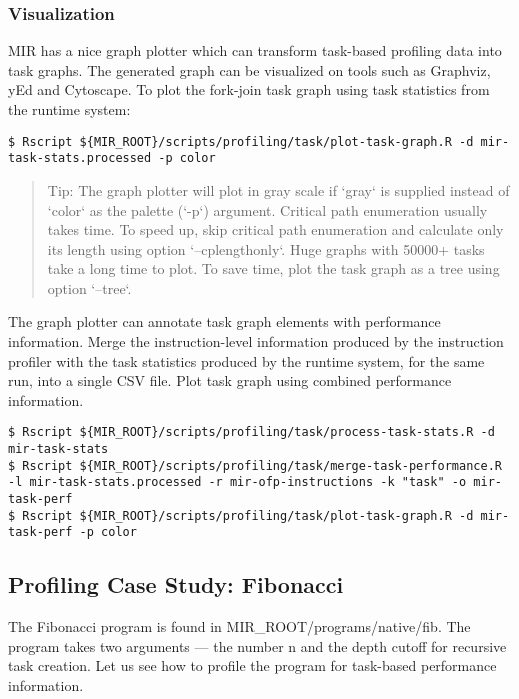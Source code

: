 \documentclass[11pt,a4paper]{article}
\begin{document}
\subsubsection{Visualization}

MIR has a nice graph plotter which can transform task-based profiling data into task graphs. The generated graph can be visualized on tools such as Graphviz, yEd and Cytoscape.  To plot the fork-join task graph using task statistics from the runtime system: 

\begin{lstlisting}[style=MyInputStyle]
$ Rscript ${MIR_ROOT}/scripts/profiling/task/plot-task-graph.R -d mir-task-stats.processed -p color
\end{lstlisting}

\begin{framed}
\begin{quote}
Tip: The graph plotter will plot in gray scale if `gray` is supplied instead of `color` as the palette (`-p`) argument. Critical path enumeration usually takes time. To speed up, skip critical path enumeration and calculate only its length using option `--cplengthonly`. Huge graphs with 50000+ tasks take a long time to plot. To save time, plot the task graph as a tree using option `--tree`.
\end{quote}
\end{framed}

The graph plotter can annotate task graph elements with performance information. Merge the instruction-level information produced by the instruction profiler with the task statistics produced by the runtime system, for the same run, into a single CSV file. Plot task graph using combined performance information.

\begin{lstlisting}[style=MyInputStyle]
$ Rscript ${MIR_ROOT}/scripts/profiling/task/process-task-stats.R -d mir-task-stats
$ Rscript ${MIR_ROOT}/scripts/profiling/task/merge-task-performance.R -l mir-task-stats.processed -r mir-ofp-instructions -k "task" -o mir-task-perf
$ Rscript ${MIR_ROOT}/scripts/profiling/task/plot-task-graph.R -d mir-task-perf -p color
\end{lstlisting}

\subsection{Profiling Case Study: Fibonacci}

The Fibonacci program is found in MIR\_ROOT/programs/native/fib. The program takes two arguments --- the number n and the depth cutoff for recursive task creation. Let us see how to profile the program for task-based performance information.  
\end{document}
